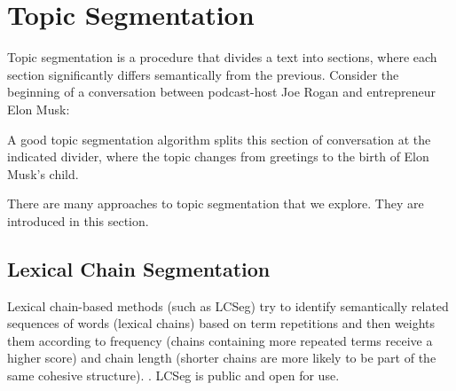 \section{Topic Segmentation \label{ssec: topic segmentation}}
Topic segmentation is a procedure that divides a text into sections, where each section significantly differs semantically from the previous. 
Consider the beginning of a conversation between podcast-host Joe Rogan and entrepreneur Elon Musk:\\


\vspace{1em} 
\hspace{2.5em} 
\vspace{1em}
        

\vspace{1em} 
A good topic segmentation algorithm splits this section of conversation at the indicated divider, where the topic changes from greetings to the birth of Elon Musk's child.


There are many approaches to topic segmentation that we explore. They are introduced in this section.

    \subsection{Lexical Chain Segmentation} 
    Lexical chain-based methods (such as LCSeg\cite{galley2003discourse}) try to identify semantically related sequences of words (lexical chains) based on term repetitions and then weights them according to frequency (chains containing more repeated terms receive a higher score) and chain length (shorter chains are more likely to be part of the same cohesive structure).\cite{galley2003discourse} \cite{hsueh2006automatic}. LCSeg is public and open for use.
    
